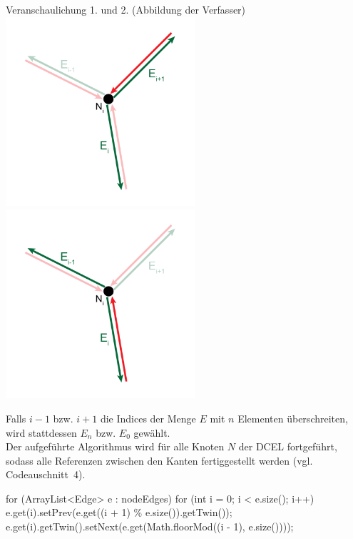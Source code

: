 \begin{Bild}{Veranschaulichung 1. und 2. (Abbildung der Verfasser)}
	\includegraphics[width = 70mm]{Bilder/Beziehung1Kanten}
	\includegraphics[width = 70mm]{Bilder/Beziehung2Kanten}
\end{Bild}

Falls $i-1$ bzw. $i+1$ die Indices der Menge $E$ mit $n$ Elementen überschreiten, wird stattdessen $E_n$ bzw. $E_0$ gewählt. \\
Der aufgeführte Algorithmus wird für alle Knoten $N$ der DCEL fortgeführt, sodass alle Referenzen zwischen den Kanten fertiggestellt werden (vgl. Codeauschnitt~4).  \\%

\begin{code}
	for (ArrayList<Edge> e : nodeEdges) {
		for (int i = 0; i < e.size(); i++) {
			e.get(i).setPrev(e.get((i + 1) \% e.size()).getTwin());
			e.get(i).getTwin().setNext(e.get(Math.floorMod((i - 1), e.size())));
		}
	}
\end{code}

